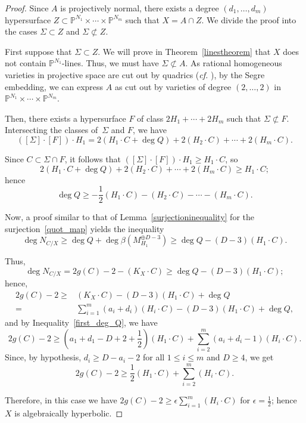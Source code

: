 \documentclass[11pt]{amsart}
\numberwithin{equation}{section}
\theoremstyle{definition}
\theoremstyle{remark}
\renewcommand{\P}{\mathbb{P}}
\begin{document}
\begin{proof}
Since $A$ is projectively normal, there exists a degree $(d_1, \hdots , d_m)$ hypersurface $Z\subset \P^{N_1}\times \cdots \times \P^{N_m}$ such that $X = A\cap Z$. We divide the proof into the cases $\Sigma \subset Z$ and $\Sigma \not \subset Z$.

First suppose  that $\Sigma \subset Z$. We will prove in Theorem~\ref{linestheorem} that $X$ does not contain $\P^{N_1}$-lines. Thus, we must have $\Sigma \not \subset A$. As rational homogeneous varieties in projective space are cut out by quadrics (\textit{cf.} \cite[Theorem 3.11 and Remark 3.12]{Ram87}), by the Segre embedding, we can express $A$ as cut out by varieties of degree $(2,\hdots ,2)$ in $\P^{N_1}\times \cdots \times \P^{N_m}$.

Then, there exists a hypersurface $F$ of class $2H_1 + \cdots + 2H_m$ such that $\Sigma \not \subset F$. Intersecting the classes of~$\Sigma$ and $F$, we have
\[ ([\Sigma]\cdot [F])\cdot H_1 = 2(H_1\cdot C + \deg Q) + 2(H_2\cdot C) + \cdots + 2(H_m\cdot C). \]

Since $C\subset \Sigma\cap F$, it follows that $([\Sigma]\cdot [F])\cdot H_1\ge H_1\cdot C$, so
\[ 2(H_1\cdot C + \deg Q) + 2(H_2\cdot C) + \cdots + 2(H_m\cdot C)\ge H_1\cdot C; \]
hence
\begin{equation}\label{first_deg_Q}
    \deg Q\ge -\frac{1}{2}(H_1\cdot C) - (H_2\cdot C) - \cdots - (H_m\cdot C).
\end{equation}

Now, a proof similar to that of Lemma~\ref{surjectioninequality} for the surjection~\eqref{quot_map} yields the inequality
\[ \deg N_{C/X}\ge \deg Q + \deg \beta(M_{H_1}^{\oplus D-3})\ge \deg Q -(D-3)(H_1\cdot C). \]

Thus,
\[ \deg N_{C/X} = 2g(C) - 2 - (K_X\cdot C)\ge\deg Q -(D-3)(H_1\cdot C); \]
hence,
\begin{align*}
    2g(C)-2\ge & (K_X\cdot C) - (D-3)(H_1\cdot C) + \deg Q \\
    = & \sum_{i=1}^m(a_i+d_i)(H_i\cdot C) - (D-3)(H_1\cdot C) + \deg Q, 
\end{align*}
and by Inequality~\eqref{first_deg_Q}, we have
\[ 2g(C)-2\ge \left (a_1+d_1-D+2+\frac{1}{2}\right )(H_1\cdot C) + \sum_{i=2}^m(a_i+d_i-1)(H_i\cdot C). \]
Since, by hypothesis, $d_i\ge D-a_i-2$ for all $1\le i\le m$ and $D\ge 4$, we get
\[ 2g(C)-2\ge \frac{1}{2}(H_1\cdot C) + \sum_{i=2}^m(H_i\cdot C). \]

Therefore, in this case we have $2g(C)-2\ge \epsilon \sum_{i=1}^m(H_i\cdot C)$ for $\epsilon = \frac{1}{2}$; hence $X$ is algebraically hyperbolic.


\end{proof}
\end{document}
